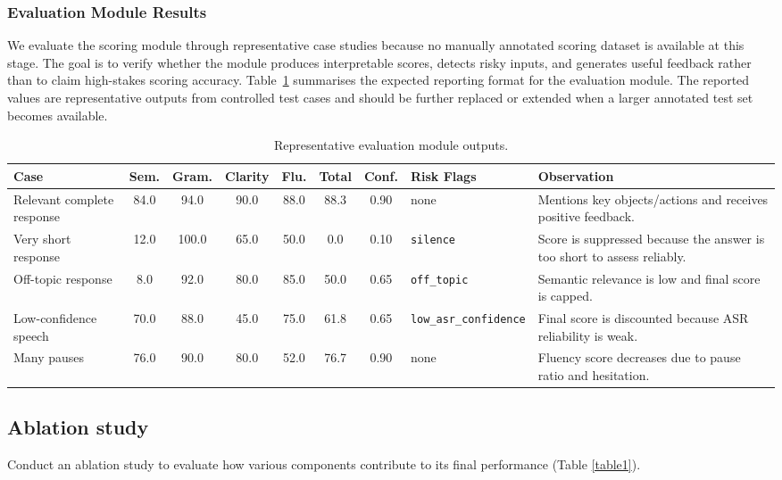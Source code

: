 \documentclass{article}
\begin{document}
\subsubsection{Evaluation Module Results}
\label{sec:evaluation-results}

We evaluate the scoring module through representative case studies
because no manually annotated scoring dataset is available at this
stage. The goal is to verify whether the module produces interpretable
scores, detects risky inputs, and generates useful feedback rather
than to claim high-stakes scoring accuracy. Table~\ref{tab:evaluation-results}
summarises the expected reporting format for the evaluation module.
The reported values are representative outputs from controlled test cases
and should be further replaced or extended when a larger annotated test set
becomes available.

\begin{table}[t]
\centering
\caption{Representative evaluation module outputs.}
\label{tab:evaluation-results}
\scriptsize
\setlength{\tabcolsep}{4pt}
\begin{tabular}{lcccccclp{}}
\toprule
Case & Sem. & Gram. & Clarity & Flu. & Total & Conf. & Risk Flags & Observation \\
\midrule
Relevant complete response & 84.0 & 94.0 & 90.0 & 88.0 & 88.3 & 0.90 & none & Mentions key objects/actions and receives positive feedback. \\
Very short response & 12.0 & 100.0 & 65.0 & 50.0 & 0.0 & 0.10 & \texttt{silence} & Score is suppressed because the answer is too short to assess reliably. \\
Off-topic response & 8.0 & 92.0 & 80.0 & 85.0 & 50.0 & 0.65 & \texttt{off\_topic} & Semantic relevance is low and final score is capped. \\
Low-confidence speech & 70.0 & 88.0 & 45.0 & 75.0 & 61.8 & 0.65 & \texttt{low\_asr\_confidence} & Final score is discounted because ASR reliability is weak. \\
Many pauses & 76.0 & 90.0 & 80.0 & 52.0 & 76.7 & 0.90 & none & Fluency score decreases due to pause ratio and hesitation. \\
\bottomrule
\end{tabular}
\end{table}

\subsection{Ablation study}
Conduct an ablation study to evaluate how various components contribute to its final performance (Table \ref{table1}).
\end{document}
